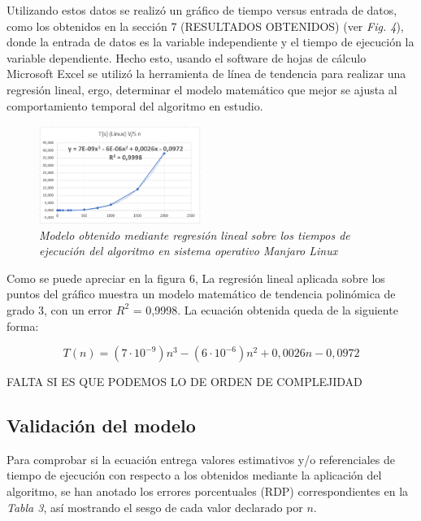 \documentclass[11pt, twocolumn]{llncs}
\begin{document}
Utilizando estos datos se realizó un gráfico de tiempo versus entrada de datos, como los obtenidos en la sección 7 (RESULTADOS OBTENIDOS) (ver \textit{Fig. 4}), donde la entrada de datos es la variable independiente y el tiempo de ejecución la variable dependiente. Hecho esto, usando el software de hojas de cálculo Microsoft Excel se utilizó la herramienta de línea de tendencia para realizar una regresión lineal, ergo, determinar el modelo matemático que mejor se ajusta al comportamiento temporal del algoritmo en estudio.

\begin{figure}[H]
\caption{\textit{\label{fig:grafico4}Modelo obtenido mediante regresión lineal sobre los tiempos de ejecución del algoritmo en sistema operativo Manjaro Linux}}
\centering
\includegraphics[width=0.47\textwidth]{imagenes/grafico_4.png}
\end{figure}

Como se puede apreciar en la figura 6, La regresión lineal aplicada sobre los puntos del gráfico muestra un modelo matemático de tendencia polinómica de grado 3, con un error $R^{2}$ = 0,9998. La ecuación obtenida queda de la siguiente forma:

{
\scriptsize
\begin{equation}
{T(n)=(7 \cdot 10^{-9})n^3-(6 \cdot 10^{-6})n^2+0,0026n-0,0972}
\end{equation}
}

FALTA SI ES QUE PODEMOS LO DE ORDEN DE COMPLEJIDAD

\subsection{Validación del modelo}

Para comprobar si la ecuación entrega valores estimativos y/o referenciales de tiempo de ejecución con respecto a los obtenidos mediante la aplicación del algoritmo, se han anotado los errores porcentuales (RDP) correspondientes en la \textit{Tabla 3}, así mostrando el sesgo de cada valor declarado por $n$.
\end{document}

